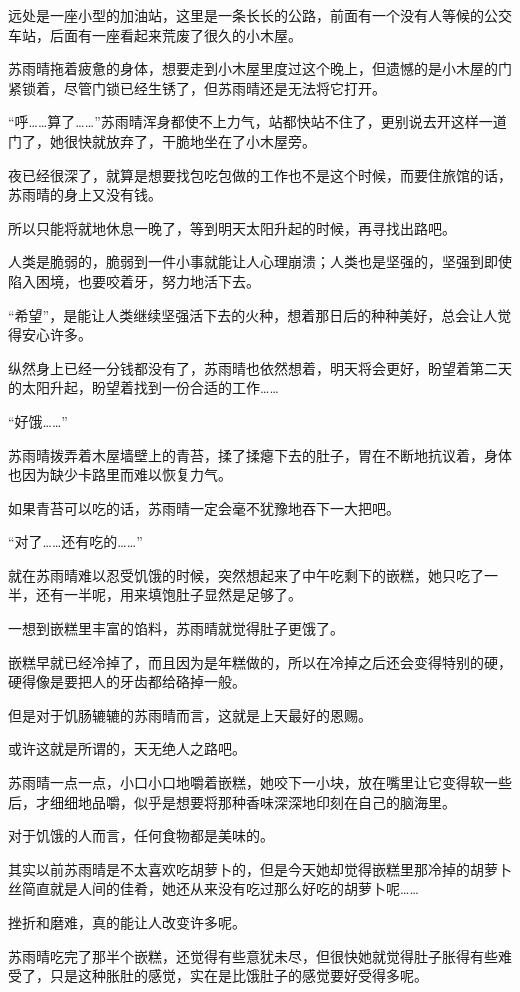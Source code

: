 远处是一座小型的加油站，这里是一条长长的公路，前面有一个没有人等候的公交车站，后面有一座看起来荒废了很久的小木屋。

苏雨晴拖着疲惫的身体，想要走到小木屋里度过这个晚上，但遗憾的是小木屋的门紧锁着，尽管门锁已经生锈了，但苏雨晴还是无法将它打开。

“呼……算了……”苏雨晴浑身都使不上力气，站都快站不住了，更别说去开这样一道门了，她很快就放弃了，干脆地坐在了小木屋旁。

夜已经很深了，就算是想要找包吃包做的工作也不是这个时候，而要住旅馆的话，苏雨晴的身上又没有钱。

所以只能将就地休息一晚了，等到明天太阳升起的时候，再寻找出路吧。

人类是脆弱的，脆弱到一件小事就能让人心理崩溃；人类也是坚强的，坚强到即使陷入困境，也要咬着牙，努力地活下去。

“希望”，是能让人类继续坚强活下去的火种，想着那日后的种种美好，总会让人觉得安心许多。

纵然身上已经一分钱都没有了，苏雨晴也依然想着，明天将会更好，盼望着第二天的太阳升起，盼望着找到一份合适的工作……

“好饿……”

苏雨晴拨弄着木屋墙壁上的青苔，揉了揉瘪下去的肚子，胃在不断地抗议着，身体也因为缺少卡路里而难以恢复力气。

如果青苔可以吃的话，苏雨晴一定会毫不犹豫地吞下一大把吧。

“对了……还有吃的……”

就在苏雨晴难以忍受饥饿的时候，突然想起来了中午吃剩下的嵌糕，她只吃了一半，还有一半呢，用来填饱肚子显然是足够了。

一想到嵌糕里丰富的馅料，苏雨晴就觉得肚子更饿了。

嵌糕早就已经冷掉了，而且因为是年糕做的，所以在冷掉之后还会变得特别的硬，硬得像是要把人的牙齿都给硌掉一般。

但是对于饥肠辘辘的苏雨晴而言，这就是上天最好的恩赐。

或许这就是所谓的，天无绝人之路吧。

苏雨晴一点一点，小口小口地嚼着嵌糕，她咬下一小块，放在嘴里让它变得软一些后，才细细地品嚼，似乎是想要将那种香味深深地印刻在自己的脑海里。

对于饥饿的人而言，任何食物都是美味的。

其实以前苏雨晴是不太喜欢吃胡萝卜的，但是今天她却觉得嵌糕里那冷掉的胡萝卜丝简直就是人间的佳肴，她还从来没有吃过那么好吃的胡萝卜呢……

挫折和磨难，真的能让人改变许多呢。

苏雨晴吃完了那半个嵌糕，还觉得有些意犹未尽，但很快她就觉得肚子胀得有些难受了，只是这种胀肚的感觉，实在是比饿肚子的感觉要好受得多呢。


